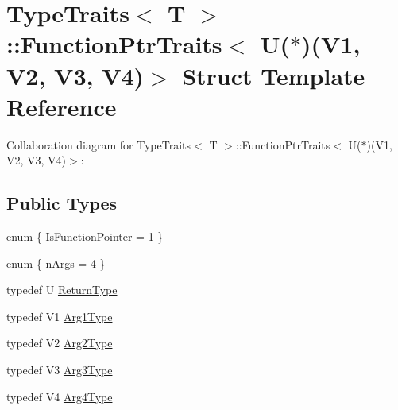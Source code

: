 \hypertarget{structTypeTraits_1_1FunctionPtrTraits_3_01U_07_5_08_07V1_00_01V2_00_01V3_00_01V4_08_4}{}\section{Type\+Traits$<$ T $>$\+:\+:Function\+Ptr\+Traits$<$ U($\ast$)(V1, V2, V3, V4)$>$ Struct Template Reference}
\label{structTypeTraits_1_1FunctionPtrTraits_3_01U_07_5_08_07V1_00_01V2_00_01V3_00_01V4_08_4}


Collaboration diagram for Type\+Traits$<$ T $>$\+:\+:Function\+Ptr\+Traits$<$ U($\ast$)(V1, V2, V3, V4)$>$\+:
\subsection*{Public Types}
\begin{DoxyCompactItemize}
\item 
enum \{ \hyperlink{structTypeTraits_1_1FunctionPtrTraits_3_01U_07_5_08_07V1_00_01V2_00_01V3_00_01V4_08_4_a514c784eb72b113be94d1584fcb53873a1ec8290a45f25f538aa02b6af5ad3f3a}{Is\+Function\+Pointer} = 1
 \}
\item 
enum \{ \hyperlink{structTypeTraits_1_1FunctionPtrTraits_3_01U_07_5_08_07V1_00_01V2_00_01V3_00_01V4_08_4_a7227e3e6b099ae6f36aa97d0713839bfa82001a8808dc0254d9e8159be647fd47}{n\+Args} = 4
 \}
\item 
typedef U \hyperlink{structTypeTraits_1_1FunctionPtrTraits_3_01U_07_5_08_07V1_00_01V2_00_01V3_00_01V4_08_4_a5404966cd8a68a746c21e0934ec668fb}{Return\+Type}
\item 
typedef V1 \hyperlink{structTypeTraits_1_1FunctionPtrTraits_3_01U_07_5_08_07V1_00_01V2_00_01V3_00_01V4_08_4_afc704987a2afcac70ae484a886c97469}{Arg1\+Type}
\item 
typedef V2 \hyperlink{structTypeTraits_1_1FunctionPtrTraits_3_01U_07_5_08_07V1_00_01V2_00_01V3_00_01V4_08_4_a27f72dbf8afca02467b67af4f3ca1adc}{Arg2\+Type}
\item 
typedef V3 \hyperlink{structTypeTraits_1_1FunctionPtrTraits_3_01U_07_5_08_07V1_00_01V2_00_01V3_00_01V4_08_4_a317f0d2787af766d28a82c50047f2204}{Arg3\+Type}
\item 
typedef V4 \hyperlink{structTypeTraits_1_1FunctionPtrTraits_3_01U_07_5_08_07V1_00_01V2_00_01V3_00_01V4_08_4_ae578a3f14e76858eaf64155fb2f86de2}{Arg4\+Type}
\end{DoxyCompactItemize}



